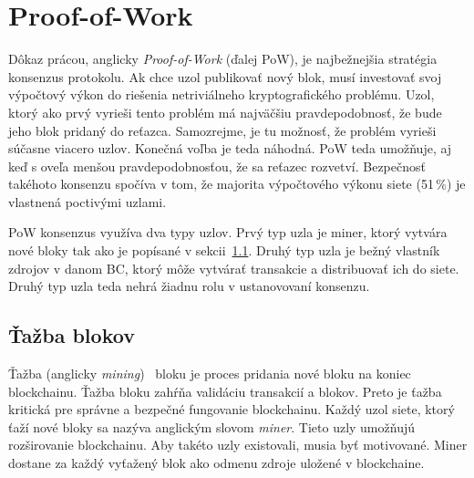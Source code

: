 \section{Proof-of-Work}\label{sec:pow}
Dôkaz prácou, anglicky \textit{Proof-of-Work} (ďalej PoW), je najbežnejšia stratégia konsenzus protokolu. Ak chce uzol publikovať nový blok, musí investovať svoj výpočtový výkon do riešenia netriviálneho kryptografického problému. Uzol, ktorý ako prvý vyrieši tento problém má najväčšiu pravdepodobnosť, že bude jeho blok pridaný do reťazca. Samozrejme, je tu možnosť, že problém vyrieši súčasne viacero uzlov. Konečná voľba je teda náhodná. PoW teda umožňuje, aj keď s oveľa menšou pravdepodobnosťou, že sa reťazec rozvetví. Bezpečnosť takéhoto konsenzu spočíva v tom, že majorita výpočtového výkonu siete (51\,\%) je vlastnená poctivými uzlami.

PoW konsenzus využíva dva typy uzlov. Prvý typ uzla je miner, ktorý vytvára nové bloky tak ako je popísané v sekcii~\ref{sec:mining}. Druhý typ uzla je bežný vlastník zdrojov v danom BC, ktorý môže vytvárať transakcie a distribuovať ich do siete. Druhý typ uzla teda nehrá žiadnu rolu v ustanovovaní konsenzu.~\cite{leporeConsensus}

\subsection{Ťažba blokov}\label{sec:mining}

Ťažba (anglicky \textit{mining})~\cite{narayanan2016bitcoin} bloku je proces pridania nové bloku na koniec blockchainu. Ťažba bloku zahŕňa validáciu transakcií a blokov. Preto je ťažba kritická pre správne a bezpečné fungovanie blockchainu. Každý uzol siete, ktorý ťaží nové bloky sa nazýva anglickým slovom \textit{miner}. Tieto uzly umožňujú rozširovanie blockchainu. Aby takéto uzly existovali, musia byť motivované. Miner dostane za každý vyťažený blok ako odmenu zdroje uložené v blockchaine.


